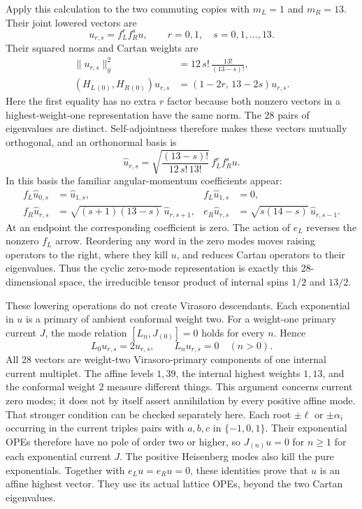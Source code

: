 \begin{example}
Apply this calculation to the two commuting copies with $m_L=1$ and
$m_R=13$. Their joint lowered vectors are
\[
 u_{r,s}=f_L^r f_R^s u,
 \qquad r=0,1,\quad s=0,1,\ldots,13.
\]
Their squared norms and Cartan weights are
\begin{align*}
 \|u_{r,s}\|_g^2&=12\,s!\,\frac{13!}{(13-s)!},\\
 (H_L{}_{(0)},H_R{}_{(0)})u_{r,s}
   &=(1-2r,\,13-2s)u_{r,s}.
\end{align*}
Here the first equality has no extra $r$ factor because both nonzero
vectors in a highest-weight-one representation have the same norm.
The 28 pairs of eigenvalues are distinct. Self-adjointness therefore
makes these vectors mutually orthogonal, and an orthonormal basis is
\begin{equation}\label{eq:c-current-multiplet-basis}
 \widehat u_{r,s}
 =\sqrt{\frac{(13-s)!}{12\,s!\,13!}}\,f_L^r f_R^s u.
\end{equation}
In this basis the familiar angular-momentum coefficients appear:
\begin{align*}
 f_L\widehat u_{0,s}&=\widehat u_{1,s},
 &f_L\widehat u_{1,s}&=0,\\
 f_R\widehat u_{r,s}
   &=\sqrt{(s+1)(13-s)}\,\widehat u_{r,s+1},
 &e_R\widehat u_{r,s}
   &=\sqrt{s(14-s)}\,\widehat u_{r,s-1}.
\end{align*}
At an endpoint the corresponding coefficient is zero. The action of
$e_L$ reverses the nonzero $f_L$ arrow. Reordering any word in the
zero modes moves raising operators to the right, where they kill
$u$, and reduces Cartan operators to their eigenvalues. Thus the
cyclic zero-mode representation is exactly this 28-dimensional space,
the irreducible tensor product of internal spins $1/2$ and $13/2$.

These lowering operations do not create Virasoro descendants.
Each exponential in $u$ is a primary of ambient conformal weight two.
For a weight-one primary current $J$, the mode relation
$[L_n,J_{(0)}]=0$ holds for every $n$. Hence
\[
 L_0u_{r,s}=2u_{r,s},\qquad L_nu_{r,s}=0\quad(n>0).
\]
All 28 vectors are weight-two Virasoro-primary components of one
internal current multiplet. The affine levels $1,39$, the internal
highest weights $1,13$, and the conformal weight $2$ measure different
things. This argument concerns current zero modes; it does not by
itself assert annihilation by every positive affine mode.
That stronger condition can be checked separately here. Each root
$\pm\ell$ or $\pm\alpha_i$ occurring in the current triples pairs
with $a,b,c$ in $\{-1,0,1\}$. Their exponential OPEs therefore have
no pole of order two or higher, so $J_{(n)}u=0$ for $n\geq1$ for
each exponential current $J$. The positive Heisenberg modes also kill
the pure exponentials. Together with $e_Lu=e_Ru=0$, these identities
prove that $u$ is an affine highest vector. They use its actual
lattice OPEs, beyond the two Cartan eigenvalues.


\end{example}

